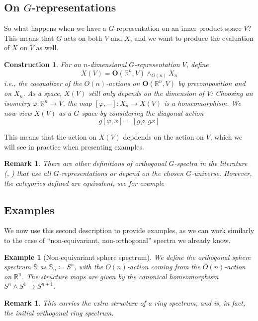 \documentclass{scrartcl}
\newcommand{\bR}{\mathbb{R}}
\newcommand{\bfO}{\mathbf{O}}
\newtheorem{rem}[subsection]{Remark}
\newtheorem{ex}[subsection]{Example}
\newtheorem{cons}[subsection]{Construction}
\begin{document}
\subsection*{On $G$-representations}

So what happens when we have a $G$-representation on an inner product space $V$? This means that $G$ acts on both $V$ and $X$, and we want to produce the evaluation of $X$ on $V$ as well.

\begin{cons}
    For an $n$-dimensional $G$-representation $V$, define $$X(V)=\bfO(\bR^n, V)\wedge_{O(n)}X_n$$ i.e., the coequalizer of the $O(n)$-actions on $\bfO(\bR^n, V)$ by precomposition and on $X_n$. As a space, $X(V)$ still only depends on the dimension of $V$: Choosing an isometry $\varphi: \bR^n\to V$, the map $[\varphi, -]:X_n\to X(V)$ is a homeomorphism. We now view $X(V)$ as a $G$-space by considering the diagonal action $$g[\varphi,x]=[g\varphi,gx]$$
\end{cons}

This means that the action on $X(V)$ depdends on the action on $V$, which we will see in practice when presenting examples.

\begin{rem}
    There are other definitions of orthogonal $G$-spectra in the literature (\cite{MM}, \cite{HHR}) that use all $G$-representations or depend on the chosen $G$-universe. However, the categories defined are equivalent, see for example \cite[2.7]{Sch23}
\end{rem}

\subsection*{Examples}
We now use this second description to provide examples, as we can work similarly to the case of ``non-equivariant, non-orthogonal'' spectra we already know.

\begin{ex}[Non-equivariant sphere spectrum]
    We define the orthogonal sphere spectrum $\mathbb{S}$ as $\mathbb{S}_n\coloneqq S^n$, with the $O(n)$-action coming from the $O(n)$-action on $\bR^n$. The structure maps are given by the canonical homeomorphism $S^n\wedge S^1\to S^{n+1}$.  
\end{ex}

\begin{rem}
    This carries the extra structure of a ring spectrum, and is, in fact, the initial orthogonal ring spectrum.
\end{rem}
\end{document}
